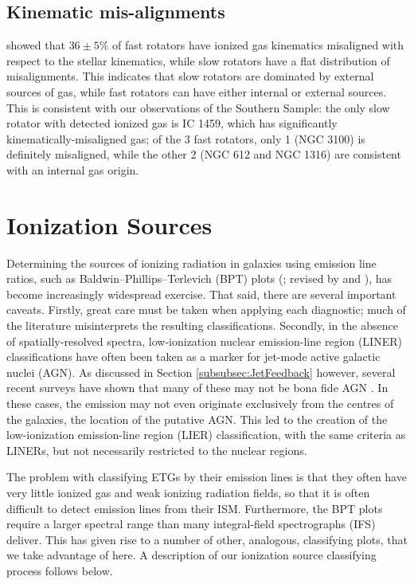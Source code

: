 	\subsection{Kinematic mis-alignments}

		\citet{Davis2011a} showed that $36\pm5$\% of fast rotators have ionized gas kinematics misaligned with respect to the stellar kinematics, while slow rotators have a flat distribution of misalignments. This indicates that slow rotators are dominated by external sources of gas, while fast rotators can have either internal or external sources. This is consistent with our observations of the Southern Sample: the only slow rotator with detected ionized gas is IC 1459, which has significantly kinematically-misaligned gas; of the 3 fast rotators, only 1 (NGC 3100) is definitely misaligned, while the other 2 (NGC 612 and NGC 1316) are consistent with an internal gas origin.



\section{Ionization Sources}
	\label{sec:Diagnostics}
	Determining the sources of ionizing radiation in galaxies using emission line ratios, such as Baldwin--Phillips--Terlevich (BPT) plots (\citealt{Baldwin1981}; revised by \citealt{Kewley2001, Kewley2006} and \citealt{Kauffmann2003a}), has become increasingly widespread exercise. That said, there are several important caveats. Firstly, great care must be taken when applying each diagnostic; much of the literature misinterprets the resulting classifications. Secondly, in the absence of spatially-resolved spectra, low-ionization nuclear emission-line region (LINER) classifications have often been taken as a marker for jet-mode active galactic nuclei (AGN). As discussed in Section \ref{subsubsec:JetFeedback} however, several recent surveys have shown that many of these may not be bona fide AGN \citep[e.g.][]{Sarzi2005, Sarzi2010, Singh2013, Belfiore2016a}. In these cases, the emission may not even originate exclusively from the centres of the galaxies, the location of the putative AGN. This led to the creation of the low-ionization emission-line region (LIER) classification, with the same criteria as LINERs, but not necessarily restricted to the nuclear regions.

	The problem with classifying ETGs by their emission lines is that they often have very little ionized gas and weak ionizing radiation fields, so that it is often difficult to detect emission lines from their ISM. Furthermore, the BPT plots require a larger spectral range than many integral-field spectrographs (IFS) deliver. This has given rise to a number of other, analogous, classifying plots, that we take advantage of here. A description of our ionization source classifying process follows below. 

